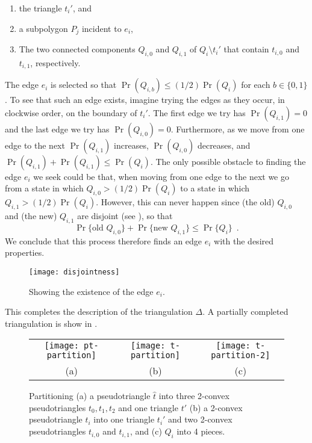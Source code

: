 \documentclass[lotsofwhite]{patmorin}
\newcommand{\z}[1]{{\hat{#1}}}
\begin{document}
\begin{enumerate}
\item the triangle $t_i'$, and
\item a subpolygon $P_j$ incident to $e_i$,
\item The two connected components $Q_{i,0}$
and $Q_{i,1}$ of $Q_i\setminus t_i'$ that contain $t_{i,0}$ and
$t_{i,1}$, respectively.
\end{enumerate}
The edge $e_i$ is selected so that $\Pr(Q_{i,b})\le (1/2)\Pr(Q_i)$ for
each $b\in\{0,1\}$.  To see that such an edge exists, imagine trying
the edges as they occur, in clockwise order, on the boundary of $t_i'$.
The first edge we try has $\Pr(Q_{i,1}) = 0$ and the last edge we try has
$\Pr(Q_{i,0}) = 0$.  Furthermore, as we move from one edge to the next
$\Pr(Q_{i,1})$ increases, $\Pr(Q_{i,0})$ decreases, and $\Pr(Q_{i,1})
+ \Pr(Q_{i,1}) \le \Pr(Q_i)$.  The only possible obstacle to finding
the edge $e_i$ we seek could be that, when moving from one edge to the
next we go from a state in which $Q_{i,0} > (1/2)\Pr(Q_i)$ to a state
in which $Q_{i,1} > (1/2)\Pr(Q_i)$. However, this can never happen since
(the old) $Q_{i,0}$ and (the new) $Q_{i,1}$ are disjoint (see ), so that
\[
   \Pr\{\mbox{old $Q_{i,0}$}\} + \Pr\{\mbox{new $Q_{i,1}$}\} \le \Pr\{Q_i\}
   \enspace .
\]
We conclude that this process therefore finds an edge $e_i$ with the desired
properties.

\begin{figure}
  \begin{center}
    \texttt{[image: disjointness]}
  \end{center}
  \caption{Showing the existence of the edge $e_i$.}
\end{figure}

This completes the description of the triangulation $\Delta$.  A partially
completed triangulation is show in .

\begin{figure}
  \begin{center}
    \begin{tabular}{ccc}
      \texttt{[image: pt-partition]} & 
      \texttt{[image: t-partition]} &
      \texttt{[image: t-partition-2]} \\
      (a) & (b) & (c)
    \end{tabular}
  \end{center}
  \caption{Partitioning (a) a pseudotriangle $\z t$ into three 2-convex
pseudotriangles $t_0,t_1,t_2$ and one triangle $t'$ (b) a 2-convex
pseudotriangle $t_i$ into one triangle $t_i'$ and two 2-convex
pseudotriangles $t_{i,0}$ and $t_{i,1}$, and (c) $Q_i$ into 4 pieces.}
\end{figure}
\end{document}

